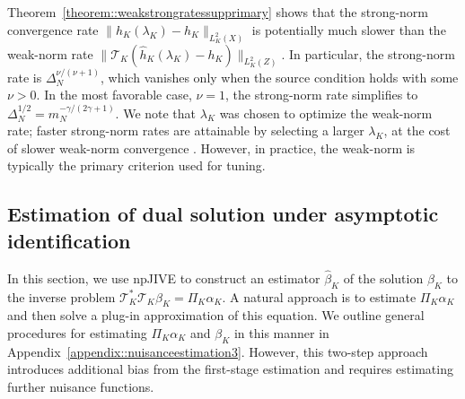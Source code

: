 \documentclass[11pt]{article}
\theoremstyle{plain}
\theoremstyle{definition}
\theoremstyle{remark}
\theoremstyle{definition}
\begin{document}
Theorem~\ref{theorem::weakstrongratessupprimary} shows that the strong-norm
convergence rate $\|\widehat{h}_K(\lambda_K) - h_K\|_{L^2_K(X)}$ is
potentially much slower than the weak-norm rate
$\|\mathcal{T}_K(\widehat{h}_K(\lambda_K) - h_K)\|_{L^2_K(Z)}$. In particular,
the strong-norm rate is $\Delta_N^{\nu/(\nu+1)}$, which vanishes only when the
source condition holds with some $\nu>0$. In the most favorable case,
$\nu=1$, the strong-norm rate simplifies to $\Delta_N^{1/2} = m_N^{-\gamma/(2\gamma+1)}$. We note that $\lambda_K$ was chosen to optimize the weak-norm rate; faster
strong-norm rates are attainable by selecting a larger $\lambda_K$, at the cost
of slower weak-norm convergence \citep{bennett2023source}. However, in practice,
the weak-norm is typically the primary criterion used for tuning.

 











 




\subsection{Estimation of dual solution under asymptotic identification}

\label{sec::nuisance2}

In this section, we use npJIVE to construct an estimator \(\widehat{\beta}_K\) of 
the solution \(\beta_K\) to the inverse problem 
\(\mathcal{T}_K^* \mathcal{T}_K \beta_K = \Pi_K \alpha_K\).  
A natural approach is to estimate \(\Pi_K \alpha_K\) and then solve a plug-in 
approximation of this equation. We outline general procedures for estimating 
\(\Pi_K \alpha_K\) and \(\beta_K\) in this manner in 
Appendix~\ref{appendix::nuisanceestimation3}. However, this two-step approach 
introduces additional bias from the first-stage estimation and requires 
estimating further nuisance functions.
\end{document}
